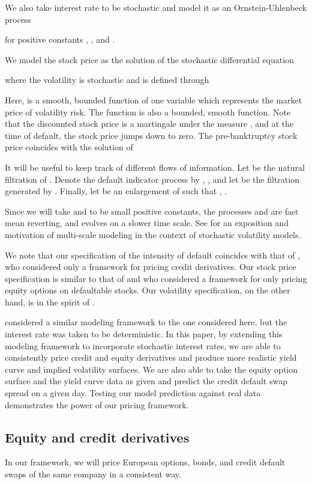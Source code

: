\documentclass[11pt]{article}
\numberwithin{equation}{section}
\begin{document}
We also take interest rate to be stochastic and model it as an Ornstein-Uhlenbeck process

for positive constants , , and .

We model the stock price as the solution of 
the 
stochastic differential equation

where the volatility is stochastic and is defined through

Here,  is a smooth, bounded function of one variable which represents the market price of volatility risk. The function  is also a bounded, smooth function. 
Note that the discounted stock price is a martingale under the measure
, and at the time of default, the stock price jumps down to zero. 
 The pre-banktruptcy stock price coincides with the solution of


It will be useful to keep track of different flows of information.
Let  be the natural filtration of .
Denote the default indicator process by , , and let  be the filtration generated by . Finally, let  be an enlargement of  such that , .  

Since we will take  and  to be small positive constants, the processes  and  are fast mean reverting, and  evolves on a slower time scale. See
\cite{ronnie-timescale} for an exposition and motivation of multi-scale modeling
in the context of stochastic volatility models.

We note that our specification of the intensity of default coincides with that of \cite{papa}, who considered only a framework for pricing credit derivatives. Our stock price specification is similar to that of \cite{Linetsky} and \cite{carr-linetsky} who considered a framework for only pricing equity options on defaultable stocks. Our volatility specification, on the other hand, is in the spirit of \cite{sircar}.

 \cite{bayraktar2008} considered a similar modeling framework to the one considered here, but the interest rate was taken to be deterministic. In this paper, by extending this modeling framework to incorporate stochastic interest rates, we are able to consistently price credit and equity derivatives and produce more realistic yield curve and implied volatility surfaces. We are also able to take the equity option surface and the yield curve data as given and predict the credit default swap spread on a given day. Testing our model prediction against real data demonstrates the power of our pricing framework.


\subsection{Equity and credit derivatives}
In our framework, we will price European options, bonds, and credit default swaps of the same company in a consistent way.
\end{document}
